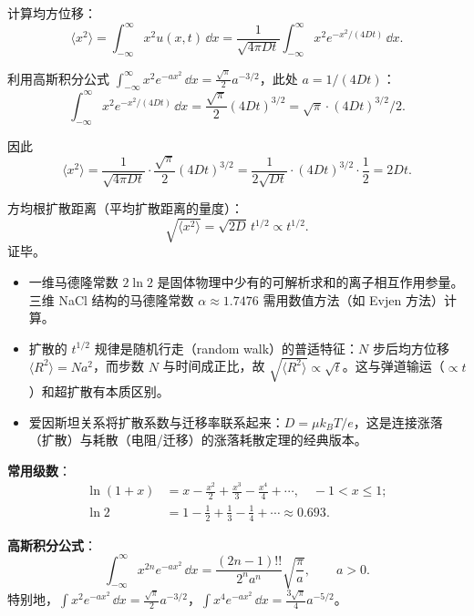 \begin{derivationbox}[标准解题过程]
计算均方位移：
\begin{equation}
\langle x^2\rangle=\int_{-\infty}^{\infty}x^2 u(x,t)\,\dd x
=\frac{1}{\sqrt{4\pi Dt}}\int_{-\infty}^{\infty}x^2 e^{-x^2/(4Dt)}\,\dd x.
\end{equation}

利用高斯积分公式 $\int_{-\infty}^{\infty}x^2 e^{-ax^2}\,\dd x=\frac{\sqrt{\pi}}{2}a^{-3/2}$，此处 $a=1/(4Dt)$：
\begin{equation}
\int_{-\infty}^{\infty}x^2 e^{-x^2/(4Dt)}\,\dd x
=\frac{\sqrt{\pi}}{2}(4Dt)^{3/2}=\sqrt{\pi}\cdot(4Dt)^{3/2}/2.
\end{equation}

因此
\begin{equation}
\langle x^2\rangle=\frac{1}{\sqrt{4\pi Dt}}\cdot\frac{\sqrt{\pi}}{2}(4Dt)^{3/2}
=\frac{1}{2\sqrt{Dt}}\cdot(4Dt)^{3/2}\cdot\frac{1}{2}
=2Dt.
\end{equation}

方均根扩散距离（平均扩散距离的量度）：
\begin{equation}
\boxed{\sqrt{\langle x^2\rangle}=\sqrt{2D}\,t^{1/2}\propto t^{1/2}.}
\end{equation}
证毕。
\end{derivationbox}

\begin{insightbox}[物理图像]
\begin{itemize}
    \item 一维马德隆常数 $2\ln2$ 是固体物理中少有的可解析求和的离子相互作用参量。三维 NaCl 结构的马德隆常数 $\alpha\approx1.7476$ 需用数值方法（如 Evjen 方法）计算。
    \item 扩散的 $t^{1/2}$ 规律是随机行走（random walk）的普适特征：$N$ 步后均方位移 $\langle R^2\rangle=Na^2$，而步数 $N$ 与时间成正比，故 $\sqrt{\langle R^2\rangle}\propto\sqrt{t}$。这与弹道输运（$\propto t$）和超扩散有本质区别。
    \item 爱因斯坦关系将扩散系数与迁移率联系起来：$D=\mu k_BT/e$，这是连接涨落（扩散）与耗散（电阻/迁移）的涨落耗散定理的经典版本。
\end{itemize}
\end{insightbox}

\begin{formulabox}[考场速记]
\textbf{常用级数}：
\begin{align}
\ln(1+x)&=x-\frac{x^2}{2}+\frac{x^3}{3}-\frac{x^4}{4}+\cdots,\quad -1<x\le1;\\
\ln2&=1-\frac{1}{2}+\frac{1}{3}-\frac{1}{4}+\cdots\approx0.693.
\end{align}

\textbf{高斯积分公式}：
\begin{equation}
\int_{-\infty}^{\infty}x^{2n}e^{-ax^2}\,\dd x
=\frac{(2n-1)!!}{2^n a^n}\sqrt{\frac{\pi}{a}},\qquad a>0.
\end{equation}
特别地，$\int x^2 e^{-ax^2}\,\dd x=\frac{\sqrt{\pi}}{2}a^{-3/2}$，$\int x^4 e^{-ax^2}\,\dd x=\frac{3\sqrt{\pi}}{4}a^{-5/2}$。
\end{formulabox}
